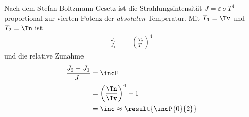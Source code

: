 Nach dem Stefan-Boltzmann-Gesetz ist die Strahlungsintensität $J = \varepsilon\,\sigma\,T^4$ proportional zur vierten Potenz der \emph{absoluten} Temperatur. Mit $T_1 = \Tv$ und $T_2 = \Tn$ ist
\begin{align}
 \frac{J_2}{J_1} &= \left(\frac{T_2}{T_1}\right)^4
\end{align}
und die relative Zunahme
\begin{align}
 \frac{J_2-J_1}{J_1} &= \incF \\
   &= \left(\frac{\Tn}{\Tv}\right)^4-1 \\
   &= \inc \approx \result{\incP{0}{2}}
\end{align}
